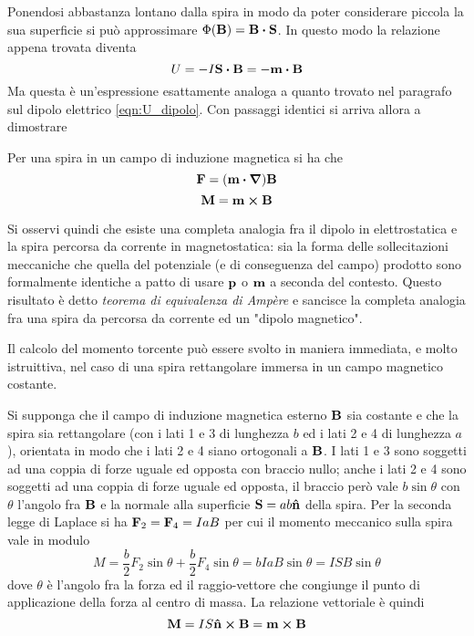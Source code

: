 Ponendosi abbastanza lontano dalla spira in modo da poter considerare piccola la sua superficie
si può approssimare $\Phi(\vb{B})=\vb{B}\vdot\vb{S}$. In questo modo la relazione appena trovata diventa
\[
    U=-I\vb{S}\vdot\vb{B}=-\vb{m}\vdot\vb{B}
\]
Ma questa è un'espressione esattamente analoga a quanto trovato nel paragrafo sul dipolo elettrico \eqref{eqn:U_dipolo}.
Con passaggi identici si arriva allora a dimostrare
\begin{thm}
    Per una spira in un campo di induzione magnetica si ha che
    \begin{equation}
        \vb{F}=(\vb{m}\vdot\grad)\vb{B}
    \end{equation}
    \begin{equation}
        \vb{M}=\vb{m}\cp\vb{B}
    \end{equation}
\end{thm}
Si osservi quindi che esiste una completa analogia fra il dipolo in elettrostatica e la spira percorsa da
corrente in magnetostatica: sia la forma delle sollecitazioni meccaniche che quella del potenziale
(e di conseguenza del campo) prodotto
sono formalmente identiche a patto di usare $\vb{p}$ o $\vb{m}$ a seconda del contesto. Questo
risultato è detto \textit{teorema di equivalenza di Ampère} e sancisce la completa analogia
fra una spira da percorsa da corrente ed un "dipolo magnetico".\

Il calcolo del momento torcente può essere svolto in maniera immediata, e molto istruittiva, nel caso di una spira rettangolare
immersa in un campo magnetico costante.
\begin{example}
    Si supponga che il campo di induzione magnetica esterno $\vb{B}$ sia costante e che la spira sia rettangolare
    (con i lati 1 e 3 di lunghezza $b$ ed i lati 2 e 4 di lunghezza $a$), orientata in modo che i lati 2 e 4
    siano ortogonali a $\vb{B}$. I lati 1 e 3 sono soggetti ad una coppia di forze uguale ed opposta con braccio nullo;
    anche i lati 2 e 4 sono soggetti ad una coppia di forze uguale ed opposta,
    il braccio però vale $b\sin\theta$ con $\theta$ l'angolo fra $\vb{B}$ e la normale alla superficie $\vb{S}=ab\vu{n}$ della spira.
    Per la seconda legge di Laplace si ha $\vb{F}_2=\vb{F}_4=IaB$ per cui il momento meccanico sulla spira vale in modulo
    \[
        M=\frac{b}{2}F_2\sin\theta+\frac{b}{2}F_4\sin\theta=bIaB\sin\theta=ISB\sin\theta
    \]
    dove $\theta$ è l'angolo fra la forza ed il raggio-vettore che congiunge il punto di applicazione della forza al centro
    di massa.
    La relazione vettoriale è quindi
    \[
        \vb{M}=IS\vu{n}\cp\vb{B}=\vb{m}\cp\vb{B}
    \]
\end{example}



